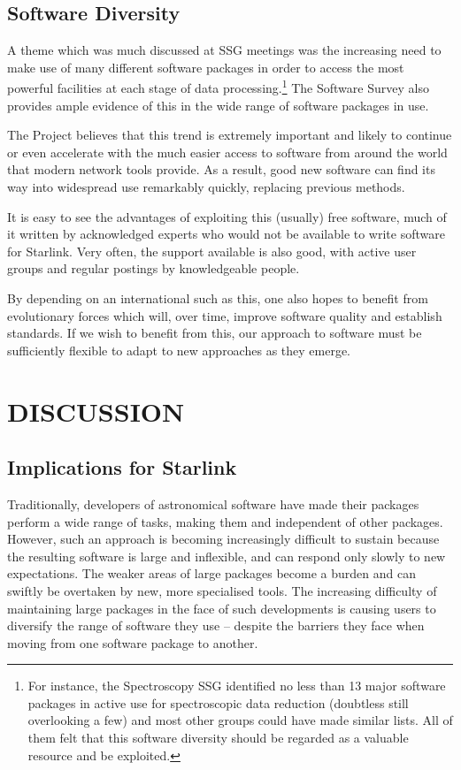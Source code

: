 \subsection{Software Diversity}

A theme which was much discussed at SSG meetings was the
increasing need to make use of many different software packages in
order to access the most powerful facilities at each stage of data
processing.\footnote{For instance, the Spectroscopy SSG identified no
less than 13 major software packages in active use for spectroscopic
data reduction (doubtless still overlooking a few) and most other
groups could have made similar lists. All of them felt that this
software diversity should be regarded as a valuable resource and be
exploited.}  The Software Survey also provides ample evidence of this
in the wide range of software packages in use.

The Project believes that this trend is extremely important and likely
to continue or even accelerate with the much easier access to software
from around the world that modern network tools provide. As a result,
good new software can find its way into widespread use remarkably
quickly, replacing previous methods.

It is easy to see the advantages of exploiting this (usually) free
software, much of it written by acknowledged experts who would not be
available to write software for Starlink.  Very often, the support
available is also good, with active user groups and regular postings by
knowledgeable people.

By depending on an international  such as this, one
also hopes to benefit from evolutionary forces which will, over time,
improve software quality and establish standards. If we wish to
benefit from this, our approach to software must be sufficiently
flexible to adapt to new approaches as they emerge.

\section{DISCUSSION}

\subsection{Implications for Starlink}

Traditionally, developers of astronomical software have made their
packages perform a wide range of tasks, making them  and
independent of other packages. However, such an approach is becoming
increasingly difficult to sustain because the resulting software is
large and inflexible, and can respond only slowly to new
expectations. The weaker areas of large packages become a burden and
can swiftly be overtaken by new, more specialised tools. The
increasing difficulty of maintaining large packages in the face of
such developments is causing users to diversify the range of software
they use -- despite the barriers they face when moving from one
software package to another.

